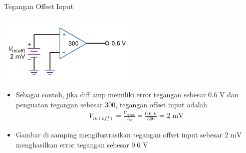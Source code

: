 \documentclass[aspectratio=169]{beamer}
\begin{document}
\begin{frame}{Tegangan Offset Input}
	\begin{multicols}{2}
		\begin{center}
			\includegraphics[height=0.4\textheight]{gambar/01.input_offset_voltage_is_equivalent_to_an_unwanted_input_voltage}
		\end{center}
		\columnbreak
		\begin{itemize}
			\item Sebagai contoh, jika diff amp memiliki error tegangan sebesar $ 0.6 \text{ V} $ dan penguatan tegangan sebesar 300, tegangan offset input adalah
			\begin{align*}
				V_{in(off)} = \frac{V_{error}}{A_v} = \frac{0.6 \text{ V}}{300} = 2 \text{ mV}
			\end{align*}
			\item Gambar di samping mengilustrasikan tegangan offset input sebesar $ 2 \text{ mV} $ menghasilkan error tegangan sebesar $ 0.6 \text{ V} $
		\end{itemize}
	\end{multicols}
\end{frame}
\end{document}
